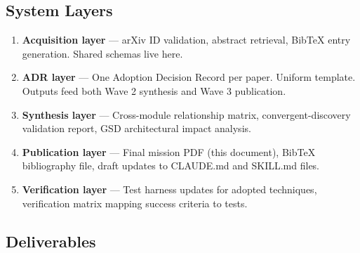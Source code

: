 \documentclass[11pt,letterpaper]{article}
\begin{document}
\subsection{System Layers}

\begin{enumerate}[leftmargin=*]
\item \textbf{Acquisition layer} --- arXiv ID validation, abstract retrieval, BibTeX entry generation. Shared schemas live here.
\item \textbf{ADR layer} --- One Adoption Decision Record per paper. Uniform template. Outputs feed both Wave 2 synthesis and Wave 3 publication.
\item \textbf{Synthesis layer} --- Cross-module relationship matrix, convergent-discovery validation report, GSD architectural impact analysis.
\item \textbf{Publication layer} --- Final mission PDF (this document), BibTeX bibliography file, draft updates to CLAUDE.md and SKILL.md files.
\item \textbf{Verification layer} --- Test harness updates for adopted techniques, verification matrix mapping success criteria to tests.
\end{enumerate}

\subsection{Deliverables}
\end{document}
